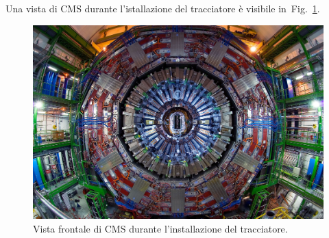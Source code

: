 Una vista di CMS durante l'istallazione del tracciatore \`e visibile in~Fig.~\ref{fig:CMS}.
\begin{figure}
\centering
\includegraphics[scale=.2]{Immagini/CMS}
\caption{Vista frontale di CMS durante l'installazione del tracciatore.}
\label{fig:CMS}
\end{figure}

